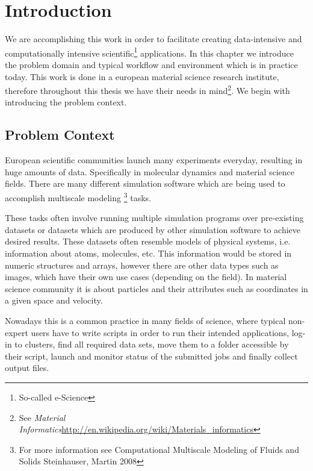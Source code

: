 \chapter{Introduction}
\label{cha:introduction}

We are accomplishing this work in order to facilitate creating data-intensive and computationally intensive 
scientific\footnote{So-called e-Science} applications. 
In this chapter we introduce the problem domain and typical workflow and environment which is in practice today.
This work is done in a european material science research institute, 
therefore throughout this thesis we have their needs in 
mind\footnote{See \textit{Material Informatics}\url{http://en.wikipedia.org/wiki/Materials_informatics}}. 
We begin with introducing the problem context.

\section{Problem Context}
European scientific communities launch many experiments everyday, resulting in huge amounts
of data. Specifically in molecular dynamics and material science fields. 
There are many different simulation software which are being used to accomplish multiscale 
modeling \footnote{For more information see Computational Multiscale Modeling of Fluids and Solids Steinhauser, Martin 2008}
tasks.

These tasks often involve running multiple simulation programs over pre-existing datasets 
or datasets which are produced by other simulation software to achieve desired results. 
These datasets often resemble models of physical systems, i.e. information about atoms, molecules, etc.
This information would be stored in numeric structures and arrays, 
however there are other data types such as images, which have their own use cases (depending on the field).
In material science community it is about particles and their attributes such as coordinates in a given space and velocity.

Nowadays this is a common practice in many fields of science, 
where typical non-expert users have to write scripts in order to run their intended applications,
log-in to clusters, find all required data sets, move them to a folder
accessible by their script, launch and monitor status of the submitted jobs
and finally collect output files.

